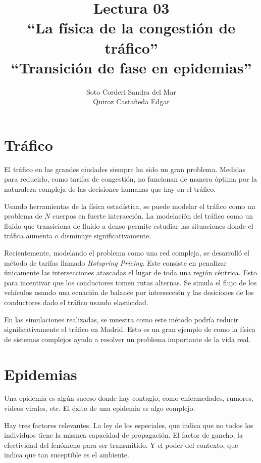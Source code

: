 \documentclass[12pt, letterpaper]{article}
\title{
    Lectura 03\\ 
    ``La física de la congestión de tráfico''\\
    ``Transición de fase en epidemias''
}
\author{
    Soto Corderi Sandra del Mar\\
    Quiroz Castañeda Edgar \\
}
\begin{document}
    \maketitle

    \section*{Tráfico}

    El tráfico en las grandes ciudades siempre ha sido un gran problema. Medidas
    para reducirlo, como tarifas de congestión, no funcionan de manera óptima 
    por la naturaleza compleja de las decisiones humanas que hay en el tráfico.

    Usando herramientas de la física estadística, se puede modelar el tráfico 
    como un problema de $N$ cuerpos en fuerte interacción. La modelación del 
    tráfico como un fluido que transiciona de fluido a denso permite estudiar 
    las situaciones donde el tráfica aumenta o disminuye significativamente.

    Recientemente, modelando el problema como una red compleja, se
    desarrolló el método de tarifas llamado \textit{Hotspring Pricing}. Este 
    consiste en penalizar únicamente las intersecciones atascadas el lugar de 
    toda una región céntrica. Esto para incentivar que los conductores tomen 
    rutas alternas. Se simula el flujo de los vehículos usando una
    ecuación de balance por intersección y las desiciones de los conductores 
    dado el tráfico usando elasticidad.

    En las simulaciones realizadas, se muestra como este método podría reducir 
    significativamente el tráfico en Madrid.
    Esto es un gran ejemplo de como la física de sistemas complejos ayuda a
    resolver un problema importante de la vida real.


    \section*{Epidemias}

    Una epidemia es algún suceso donde hay contagio, como enfermedades, rumores,
    videos virales, etc. El éxito de una epidemia es algo complejo.

    Hay tres factores relevantes.
    La ley de los especiales, que indica que no todos los individuos 
    tiene la mismca capacidad de propagación.
    El factor de gancho, la efectividad del fenómeno para ser transmitido. 
    Y el poder del contexto, que indica que tan suceptible es el 
    ambiente.
\end{document}
